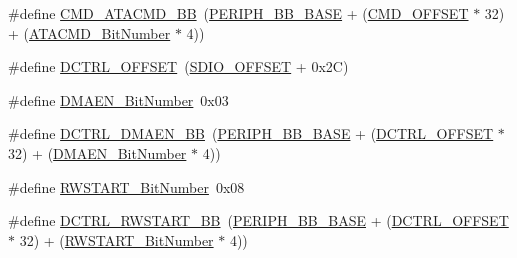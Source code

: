 \begin{DoxyCompactItemize}
\item 
\#define \mbox{\hyperlink{group___s_d_i_o___private___types_definitions_gabb7e537f931b6fdd3b49e826f2e19d7c}{C\+M\+D\+\_\+\+A\+T\+A\+C\+M\+D\+\_\+\+BB}}~(\mbox{\hyperlink{group___peripheral__memory__map_gaed7efc100877000845c236ccdc9e144a}{P\+E\+R\+I\+P\+H\+\_\+\+B\+B\+\_\+\+B\+A\+SE}} + (\mbox{\hyperlink{group___s_d_i_o___private___types_definitions_gaf12d26702ce7a88d2a3dae87f000b75e}{C\+M\+D\+\_\+\+O\+F\+F\+S\+ET}} $\ast$ 32) + (\mbox{\hyperlink{group___s_d_i_o___private___types_definitions_gabd4fd3bb700b879f843ccc867db1832e}{A\+T\+A\+C\+M\+D\+\_\+\+Bit\+Number}} $\ast$ 4))
\item 
\#define \mbox{\hyperlink{group___s_d_i_o___private___types_definitions_ga948c1382c4cfd3af3e406c4d0cdd4240}{D\+C\+T\+R\+L\+\_\+\+O\+F\+F\+S\+ET}}~(\mbox{\hyperlink{group___s_d_i_o___private___types_definitions_gabf07aced03df5f46d57cea1d4f56d1e3}{S\+D\+I\+O\+\_\+\+O\+F\+F\+S\+ET}} + 0x2\+C)
\item 
\#define \mbox{\hyperlink{group___s_d_i_o___private___types_definitions_gab2af311e327213503f0dbf3d013b7944}{D\+M\+A\+E\+N\+\_\+\+Bit\+Number}}~0x03
\item 
\#define \mbox{\hyperlink{group___s_d_i_o___private___types_definitions_ga43f7336d4f955c6cf1f676ccbc043fe9}{D\+C\+T\+R\+L\+\_\+\+D\+M\+A\+E\+N\+\_\+\+BB}}~(\mbox{\hyperlink{group___peripheral__memory__map_gaed7efc100877000845c236ccdc9e144a}{P\+E\+R\+I\+P\+H\+\_\+\+B\+B\+\_\+\+B\+A\+SE}} + (\mbox{\hyperlink{group___s_d_i_o___private___types_definitions_ga948c1382c4cfd3af3e406c4d0cdd4240}{D\+C\+T\+R\+L\+\_\+\+O\+F\+F\+S\+ET}} $\ast$ 32) + (\mbox{\hyperlink{group___s_d_i_o___private___types_definitions_gab2af311e327213503f0dbf3d013b7944}{D\+M\+A\+E\+N\+\_\+\+Bit\+Number}} $\ast$ 4))
\item 
\#define \mbox{\hyperlink{group___s_d_i_o___private___types_definitions_ga773045c51d3e8daee0c181517c44a2df}{R\+W\+S\+T\+A\+R\+T\+\_\+\+Bit\+Number}}~0x08
\item 
\#define \mbox{\hyperlink{group___s_d_i_o___private___types_definitions_gac776c39dfac0e1ed007217133e1145c3}{D\+C\+T\+R\+L\+\_\+\+R\+W\+S\+T\+A\+R\+T\+\_\+\+BB}}~(\mbox{\hyperlink{group___peripheral__memory__map_gaed7efc100877000845c236ccdc9e144a}{P\+E\+R\+I\+P\+H\+\_\+\+B\+B\+\_\+\+B\+A\+SE}} + (\mbox{\hyperlink{group___s_d_i_o___private___types_definitions_ga948c1382c4cfd3af3e406c4d0cdd4240}{D\+C\+T\+R\+L\+\_\+\+O\+F\+F\+S\+ET}} $\ast$ 32) + (\mbox{\hyperlink{group___s_d_i_o___private___types_definitions_ga773045c51d3e8daee0c181517c44a2df}{R\+W\+S\+T\+A\+R\+T\+\_\+\+Bit\+Number}} $\ast$ 4))

\end{DoxyCompactItemize}
